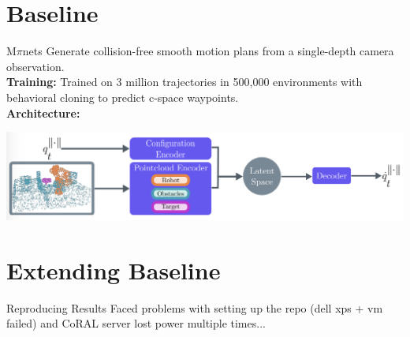 \documentclass{beamer}
\begin{document}
\section{Baseline}
\begin{frame}[t]{M$\pi$nets}
    Generate collision-free smooth motion plans from a single-depth camera observation.
    \\
    \textbf{Training:} Trained on 3 million trajectories in 500,000 environments with behavioral cloning to predict c-space waypoints.
    \\
    \textbf{Architecture:}
    \begin{center}
        \includegraphics[width=1.\textwidth]{./img/mpinet_0.png}
    \end{center}
\end{frame}

\section{Extending Baseline}
\begin{frame}[t]{Reproducing Results}
    Faced problems with setting up the repo (dell xps + vm failed)
    and CoRAL server lost power multiple times...
    \begin{center}
    \end{center}
\end{frame}
\end{document}
